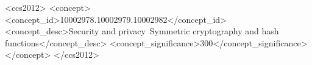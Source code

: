 \documentclass[sigconf,anonymous]{acmart}
\begin{document}
\begin{abstract}
  
\end{abstract}


\begin{CCSXML}
<ccs2012>
<concept>
<concept_id>10002978.10002979.10002982</concept_id>
<concept_desc>Security and privacy~Symmetric cryptography and hash functions</concept_desc>
<concept_significance>300</concept_significance>
</concept>
</ccs2012>
\end{CCSXML}




\maketitle


\end{document}
